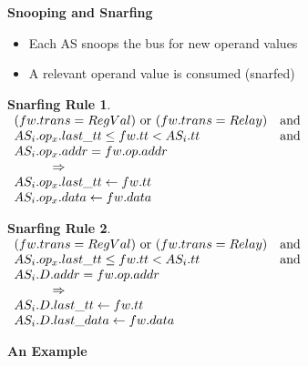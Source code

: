 \documentclass[12pt]{slides}
\newtheorem{snarf}{Snarfing Rule}
\begin{document}
\begin{slide}
\begin{center}
\textbf {Snooping and Snarfing}
\end{center}
%
\begin{itemize}
%
\item Each AS snoops the bus for new operand values
%
\item A relevant operand value is consumed (snarfed)
%
\end{itemize}

\begin{snarf}
\label{snar:regop}
\mbox{} \\
\(
\begin{array}{ll}
(fw.trans = RegVal)\ \textup{or} \ (fw.trans = Relay) & \textup{and} \\
AS_i.op_x.last\_tt \leq fw.tt < AS_i.tt & \textup{and}\\
AS_i.op_x.addr = fw.op.addr \\
\hspace{3em} \Rightarrow \\
AS_i.op_x.last\_tt \leftarrow fw.tt\\
AS_i.op_x.data \leftarrow fw.data
\end{array}
\)
\end{snarf}



\begin{snarf}
\label{snar:outregop}
\mbox{} \\
\(
\begin{array}{ll}
(fw.trans = RegVal)\ \textup{or} \ (fw.trans = Relay) & \textup{and} \\
AS_i.op_x.last\_tt \leq fw.tt < AS_i.tt & \textup{and}\\
AS_i.D.addr = fw.op.addr \\
\hspace{3em} \Rightarrow \\
AS_i.D.last\_tt \leftarrow fw.tt\\
AS_i.D.last\_data \leftarrow fw.data
\end{array}
\)
\end{snarf}

\end{slide}



\begin{slide}
\begin{center}
\textbf {An Example}
\end{center}
%
\centering
{}

\end{slide}
\end{document}
